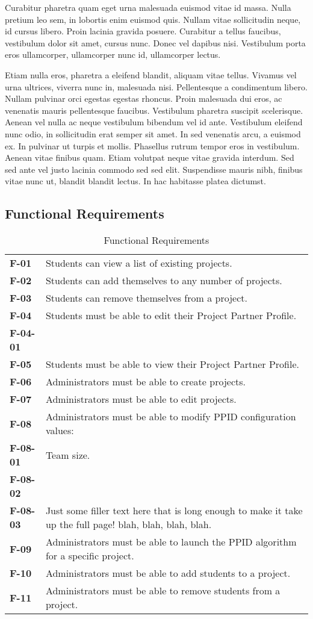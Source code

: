 \documentclass[12pt,letterpaper]{article}
\begin{document}
Curabitur pharetra quam eget urna malesuada euismod vitae
id massa. Nulla pretium leo sem, in lobortis enim euismod quis. Nullam
vitae sollicitudin neque, id cursus libero. Proin lacinia gravida
posuere. Curabitur a tellus faucibus, vestibulum dolor sit amet, cursus
nunc. Donec vel dapibus nisi. Vestibulum porta eros ullamcorper,
ullamcorper nunc id, ullamcorper lectus.

Etiam nulla eros, pharetra a eleifend blandit, aliquam vitae
tellus. Vivamus vel urna ultrices, viverra nunc in, malesuada nisi.
Pellentesque a condimentum libero. Nullam pulvinar orci egestas egestas
rhoncus. Proin malesuada dui eros, ac venenatis mauris pellentesque
faucibus. Vestibulum pharetra suscipit scelerisque. Aenean vel nulla
ac neque vestibulum bibendum vel id ante. Vestibulum eleifend nunc
odio, in sollicitudin erat semper sit amet. In sed venenatis arcu,
a euismod ex. In pulvinar ut turpis et mollis. Phasellus rutrum tempor
eros in vestibulum. Aenean vitae finibus quam. Etiam volutpat neque
vitae gravida interdum. Sed sed ante vel justo lacinia commodo sed
sed elit. Suspendisse mauris nibh, finibus vitae nunc ut, blandit
blandit lectus. In hac habitasse platea dictumst.

\subsection{Functional Requirements}

\begin{table}[H]
\caption{Functional Requirements}
\renewcommand{\arraystretch}{1.5}
\everyrow{\hline}
\begin{tabu} to 
F-01 & Students can view a list of existing projects. \\
F-02 & Students can add themselves to any number of projects. \\
F-03 & Students can remove themselves from a project. \\
F-04 & Students must be able to edit their Project Partner Profile. \\
F-04-01 & \\
F-05 & Students must be able to view their Project Partner Profile. \\
F-06 & Administrators must be able to create projects. \\
F-07 & Administrators must be able to edit projects. \\
F-08 & Administrators must be able to modify PPID configuration values: \\
F-08-01 & Team size. \\
F-08-02 & \\
F-08-03 & Just some filler text here that is long enough to make it take up the full page! blah, blah, blah, blah. \\
F-09 & Administrators must be able to launch the PPID algorithm for a specific project. \\
F-10 & Administrators must be able to add students to a project. \\
F-11 & Administrators must be able to remove students from a project. \\
\end{tabu}
\end{table}
\end{document}
